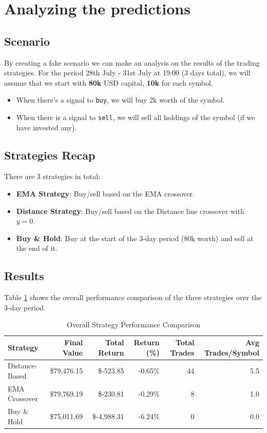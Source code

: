 \documentclass{article}
\begin{document}
\section{Analyzing the predictions}

\subsection{Scenario}
By creating a fake scenario we can make an analysis on the results of the trading strategies.
For the period 28th July - 31st July at 19:00 (3 days total), we will assume that we start with 
\textbf{80k} USD capital, \textbf{10k} for each symbol. 

\begin{itemize}
    \item When there's a signal to \texttt{buy}, we will buy 2k worth of the symbol.
    \item When there is a signal to \texttt{sell}, we will sell all holdings of the symbol (if we have invested any).
\end{itemize}

\subsection{Strategies Recap}
There are 3 strategies in total:
\begin{itemize}
    \item \textbf{EMA Strategy}: Buy/sell based on the EMA crossover.
    \item \textbf{Distance Strategy}: Buy/sell based on the Distance line crossover with $y=0$.
    \item \textbf{Buy \& Hold}: Buy at the start of the 3-day period (80k worth) and sell at the end of it.
\end{itemize}

\subsection{Results}
Table \ref{tab:strategy-performance} shows the overall performance comparison of the three strategies 
over the 3-day period.

\begin{table}[H]
    \centering
    \begin{tabular}{|l|r|r|r|r|r|}
        \hline
        \textbf{Strategy} & \textbf{Final Value} & \textbf{Total Return} & \textbf{Return (\%)} & \textbf{Total Trades} & \textbf{Avg Trades/Symbol} \\
        \hline
        Distance-Based & \$79,476.15 & \$-523.85 & -0.65\% & 44 & 5.5 \\
        \hline
        EMA Crossover & \$79,769.19 & \$-230.81 & -0.29\% & 8 & 1.0 \\
        \hline
        Buy \& Hold & \$75,011.69 & \$-4,988.31 & -6.24\% & 0 & 0.0 \\
        \hline
    \end{tabular}
    \caption{Overall Strategy Performance Comparison}
    \label{tab:strategy-performance}
\end{table}
\end{document}
